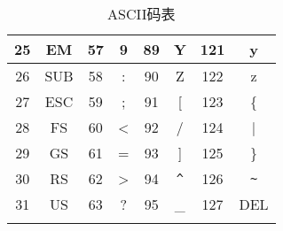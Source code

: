 \begin{longtable}{|c|c|c|c|c|c|c|c|}
	\hline
	25             & EM            & 57             & 9             & 89             & Y                      & 121            & y                      \\
	\hline
	26             & SUB           & 58             & :             & 90             & Z                      & 122            & z                      \\
	\hline
	27             & ESC           & 59             & ;             & 91             & [                      & 123            & \{                     \\
			\hline
	28             & FS            & 60             & <             & 92             & /                      & 124            & |                      \\
			\hline
	29             & GS            & 61             & =             & 93             & ]                      & 125            & \}                     \\
	\hline
	30             & RS            & 62             & >             & 94             & \lstinline|^| & 126            & \lstinline|~| \\
	\hline
	31             & US            & 63             & ?             & 95             & \_                     & 127            & DEL                    \\
	\hline
	\caption{ASCII码表}
\end{longtable}